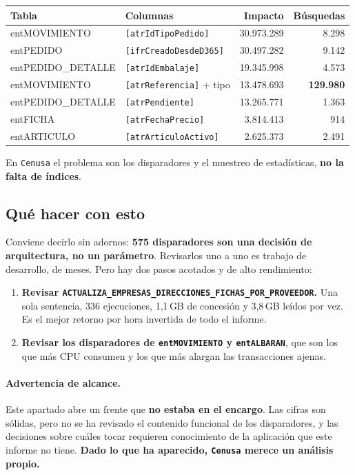 \documentclass[11pt,a4paper]{article}
\newcommand{\cod}[1]{\texttt{\small #1}}
\newcommand{\aviso}[1]{\textcolor{ambar}{\textbf{#1}}}
\begin{document}
\begin{table}[h]
\centering
\small
\begin{tabular}{llrr}
\toprule
\textbf{Tabla} & \textbf{Columnas} & \textbf{Impacto} & \textbf{Búsquedas} \\
\midrule
entMOVIMIENTO      & \cod{[atrIdTipoPedido]} & 30.973.289 & 8.298 \\
entPEDIDO          & \cod{[ifrCreadoDesdeD365]} & 30.497.282 & 9.142 \\
entPEDIDO\_DETALLE & \cod{[atrIdEmbalaje]} & 19.345.998 & 4.573 \\
entMOVIMIENTO      & \cod{[atrReferencia]} + tipo & 13.478.693 & \aviso{129.980} \\
entPEDIDO\_DETALLE & \cod{[atrPendiente]} & 13.265.771 & 1.363 \\
entFICHA           & \cod{[atrFechaPrecio]} & 3.814.413 & 914 \\
entARTICULO        & \cod{[atrArticuloActivo]} & 2.625.373 & 2.491 \\
\bottomrule
\end{tabular}
\end{table}

En \cod{Cenusa} el problema son los disparadores y el muestreo de
estadísticas, \textbf{no la falta de índices}.

\subsection{Qué hacer con esto}

Conviene decirlo sin adornos: \textbf{575 disparadores son una decisión de
arquitectura, no un parámetro}. Revisarlos uno a uno es trabajo de
desarrollo, de meses. Pero hay dos pasos acotados y de alto rendimiento:

\begin{enumerate}[leftmargin=1.4em]\itemsep2pt
  \item \textbf{Revisar
        \cod{ACTUALIZA\_EMPRESAS\_DIRECCIONES\_FICHAS\_POR\_PROVEEDOR}.} Una
        sola sentencia, 336 ejecuciones, 1,1\,GB de concesión y 3,8\,GB
        leídos por vez. Es el mejor retorno por hora invertida de todo el
        informe.
  \item \textbf{Revisar los disparadores de \cod{entMOVIMIENTO} y
        \cod{entALBARAN}}, que son los que más CPU consumen y los que más
        alargan las transacciones ajenas.
\end{enumerate}

\paragraph{Advertencia de alcance.} Este apartado abre un frente que
\textbf{no estaba en el encargo}. Las cifras son sólidas, pero no se ha
revisado el contenido funcional de los disparadores, y las decisiones sobre
cuáles tocar requieren conocimiento de la aplicación que este informe no
tiene. \textbf{Dado lo que ha aparecido, \cod{Cenusa} merece un análisis
propio.}
\end{document}

